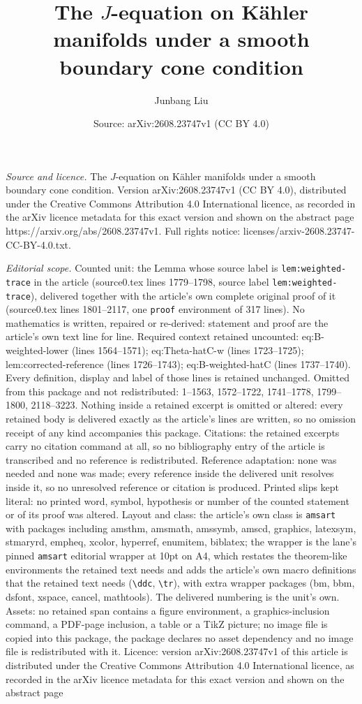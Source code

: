 \documentclass[10pt,a4paper]{amsart}
\title[The $J$-equation on K\"ahler manifolds under a smooth bounda]{The $J$-equation on K\"ahler manifolds under a smooth boundary cone condition}
\author{Junbang Liu}
\date{Source: arXiv:2608.23747v1 (CC BY 4.0)}
\begin{document}
\maketitle

\noindent\emph{Source and licence.} The $J$-equation on K\"ahler manifolds under a smooth boundary cone condition. Version arXiv:2608.23747v1 (CC BY 4.0), distributed under the Creative Commons Attribution 4.0 International licence, as recorded in the arXiv licence metadata for this exact version and shown on the abstract page https://arxiv.org/abs/2608.23747v1. Full rights notice: licenses/arxiv-2608.23747-CC-BY-4.0.txt.\par\smallskip

\noindent\textit{Editorial scope.} Counted unit: the Lemma whose source label is \texttt{lem:weighted-trace} in the article (source0.tex lines 1779--1798, source label \texttt{lem:weighted-trace}), delivered together with the article's own complete original proof of it (source0.tex lines 1801--2117, one \texttt{proof} environment of 317 lines). No mathematics is written, repaired or re-derived: statement and proof are the article's own text line for line. Required context retained uncounted: eq:B-weighted-lower (lines 1564--1571); eq:Theta-hatC-w (lines 1723--1725); lem:corrected-reference (lines 1726--1743); eq:B-weighted-hatC (lines 1737--1740). Every definition, display and label of those lines is retained unchanged. Omitted from this package and not redistributed: 1--1563, 1572--1722, 1741--1778, 1799--1800, 2118--3223. Nothing inside a retained excerpt is omitted or altered: every retained body is delivered exactly as the article's lines are written, so no omission receipt of any kind accompanies this package. Citations: the retained excerpts carry no citation command at all, so no bibliography entry of the article is transcribed and no reference is redistributed. Reference adaptation: none was needed and none was made; every reference inside the delivered unit resolves inside it, so no unresolved reference or citation is produced. Printed slips kept literal: no printed word, symbol, hypothesis or number of the counted statement or of its proof was altered. Layout and class: the article's own class is \texttt{amsart} with packages including amsthm, amsmath, amssymb, amscd, graphics, latexsym, stmaryrd, empheq, xcolor, hyperref, enumitem, biblatex; the wrapper is the lane's pinned \texttt{amsart} editorial wrapper at 10pt on A4, which restates the theorem-like environments the retained text needs and adds the article's own macro definitions that the retained text needs (\texttt{\textbackslash ddc}, \texttt{\textbackslash tr}), with extra wrapper packages (bm, bbm, dsfont, xspace, cancel, mathtools). The delivered numbering is the unit's own. Assets: no retained span contains a figure environment, a graphics-inclusion command, a PDF-page inclusion, a table or a TikZ picture; no image file is copied into this package, the package declares no asset dependency and no image file is redistributed with it. Licence: version arXiv:2608.23747v1 of this article is distributed under the Creative Commons Attribution 4.0 International licence, as recorded in the arXiv licence metadata for this exact version and shown on the abstract page 
\end{document}
